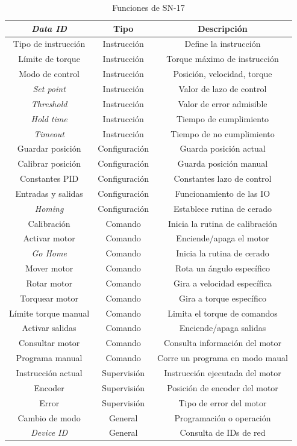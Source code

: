 \begin{table}[h]
	\centering
	\caption[Operaciones SN-17]{Funciones de SN-17}
	\begin{tabular}{c c c}    
		\toprule
		\textbf{\textit{Data ID}} 	& \textbf{Tipo}  & \textbf{Descripción}\\
		\midrule
		Tipo de instrucción & Instrucción 	& Define la instrucción\\		
		Límite de torque 	& Instrucción	& Torque máximo de instrucción \\
		Modo de control		& Instrucción 	& Posición, velocidad, torque \\
		\textit{Set point}	& Instrucción 	& Valor de lazo de control \\
		\textit{Threshold}	& Instrucción 	& Valor de error admisible \\
		\textit{Hold time}	& Instrucción 	& Tiempo de cumplimiento \\
		\textit{Timeout}	& Instrucción 	& Tiempo de no cumplimiento \\
		Guardar posición	& Configuración & Guarda posición actual \\
		Calibrar posición	& Configuración & Guarda posición manual \\
		Constantes PID		& Configuración & Constantes lazo de control \\	
		Entradas y salidas	& Configuración & Funcionamiento de las IO \\
		\textit{Homing}		& Configuración & Establece rutina de cerado \\	
		Calibración			& Comando		& Inicia la rutina de calibración \\
		Activar motor		& Comando		& Enciende/apaga el motor \\		
		\textit{Go Home}	& Comando		& Inicia la rutina de cerado \\		
		Mover motor			& Comando		& Rota un ángulo específico\\
		Rotar motor			& Comando		& Gira a velocidad específica \\
		Torquear motor		& Comando		& Gira a torque específico \\
		Límite torque manual& Comando		& Limita el torque de comandos \\
		Activar salidas		& Comando		& Enciende/apaga salidas \\	
		Consultar motor		& Comando		& Consulta información del motor \\
		Programa manual		& Comando		& Corre un programa en modo maual \\
		Instrucción actual	& Supervisión	& Instrucción ejecutada del motor \\
		Encoder				& Supervisión	& Posición de encoder del motor \\
		Error				& Supervisión	& Tipo de error del motor \\
		Cambio de modo		& General		& Programación o operación \\
		\textit{Device ID}	& General		& Consulta de IDs de red \\
		\bottomrule
		\hline
	\end{tabular}
	\label{tab:tipos_mensajes_CAN}
\end{table}

